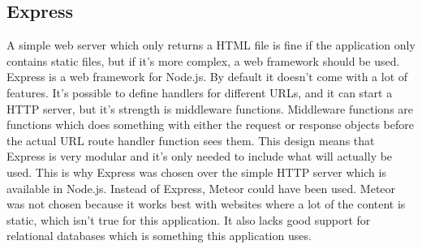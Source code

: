 \subsection{Express}
A simple web server which only returns a HTML file is fine if the application only contains static files, but if it's more complex, a web framework should be used. Express\cite{express} is a web framework for Node.js. By default it doesn't come with a lot of features. It's possible to define handlers for different URLs, and it can start a HTTP server, but it's strength is middleware functions. Middleware functions are functions which does something with either the request or response objects before the actual URL route handler function sees them. This design means that Express is very modular and it's only needed to include what will actually be used. This is why Express was chosen over the simple HTTP server which is available in Node.js. Instead of Express, Meteor\cite{meteor} could have been used. Meteor was not chosen because it works best with websites where a lot of the content is static, which isn't true for this application. It also lacks good support for relational databases which is something this application uses.